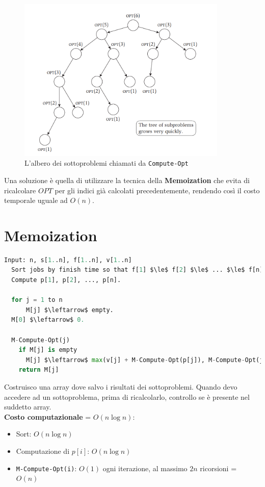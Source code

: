 \begin{figure}[H]
\centering
  \includegraphics[width=10cm]{Programmazione_dinamica/imgs/wis_subproblem_tree.png}
  \caption{L'albero dei sottoproblemi chiamati da \texttt{Compute-Opt}}
\end{figure}

Una soluzione è quella di utilizzare la tecnica della
\textbf{Memoization} che evita di ricalcolare $OPT$ per gli indici già
calcolati precedentemente, rendendo così il costo temporale uguale ad
$O(n)$.


\section{Memoization}

\begin{lstlisting}[language=Python, mathescape=true]
  Input: n, s[1..n], f[1..n], v[1..n]
  Sort jobs by finish time so that f[1] $\le$ f[2] $\le$ ... $\le$ f[n]. 
  Compute p[1], p[2], ..., p[n].

  for j = 1 to n 
	  M[j] $\leftarrow$ empty.
  M[0] $\leftarrow$ 0.

  M-Compute-Opt(j)
    if M[j] is empty
  	  M[j] $\leftarrow$ max(v[j] + M-Compute-Opt(p[j]), M-Compute-Opt(j - 1)) 
    return M[j]

\end{lstlisting}

Costruisco una array dove salvo i risultati dei sottoproblemi. Quando
devo accedere ad un sottoproblema, prima di ricalcolarlo, controllo se è
presente nel suddetto array.\\

\textbf{Costo computazionale} = $O(n\log{n})$:

\begin{itemize}
  \item
        Sort: $O(n\log{n})$
  \item
        Computazione di $p[i]$: $O(n\log{n})$
  \item
        \texttt{M-Compute-Opt(i)}: $O(1)$ ogni iterazione, al massimo $2n$
        ricorsioni = $O(n)$
\end{itemize}

